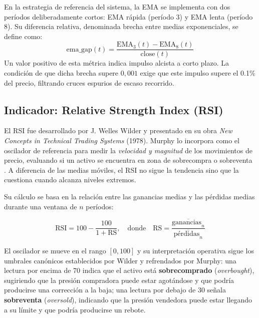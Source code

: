 En la estrategia de referencia del sistema, la EMA se implementa con dos períodos deliberadamente cortos: EMA rápida (período 3) y EMA lenta (período 8). Su diferencia relativa, denominada brecha entre medias exponenciales, se define como:
$$\text{ema\_gap}(t) = \frac{\text{EMA}_3(t) - \text{EMA}_8(t)}{\text{close}(t)}$$
Un valor positivo de esta métrica indica impulso alcista a corto plazo.
La condición de que dicha brecha supere $0{,}001$ exige que este impulso supere el 0.1\%
del precio, filtrando cruces espurios de escaso recorrido.

\subsection{Indicador: Relative Strength Index (RSI)}

El RSI fue desarrollado por J. Welles Wilder y presentado en su obra \textit{New Concepts in Technical Trading Systems} (1978). Murphy lo incorpora como el oscilador de referencia para medir la \textit{velocidad y magnitud} de los movimientos de precio, evaluando si un activo se encuentra en zona de sobrecompra o sobreventa \parencite{murphy_technical_1999}. A diferencia de las medias móviles, el RSI no sigue la tendencia sino que la cuestiona cuando alcanza niveles extremos.

Su cálculo se basa en la relación entre las ganancias medias y las pérdidas medias durante una ventana de $n$ períodos:

$$\text{RSI} = 100 - \frac{100}{1 + \text{RS}}, \quad \text{donde} \quad \text{RS} = \frac{\overline{\text{ganancias}_n}}{\overline{\text{pérdidas}_n}}$$

El oscilador se mueve en el rango $[0, 100]$ y su interpretación operativa sigue los umbrales canónicos establecidos por Wilder y refrendados por Murphy: una lectura por encima de 70 indica que el activo está \textbf{sobrecomprado} (\textit{overbought}), sugiriendo que la presión compradora puede estar agotándose y que podría producirse una corrección a la baja; una lectura por debajo de 30 señala \textbf{sobreventa} (\textit{oversold}), indicando que la presión vendedora puede estar llegando a su límite y que podría producirse un rebote.

